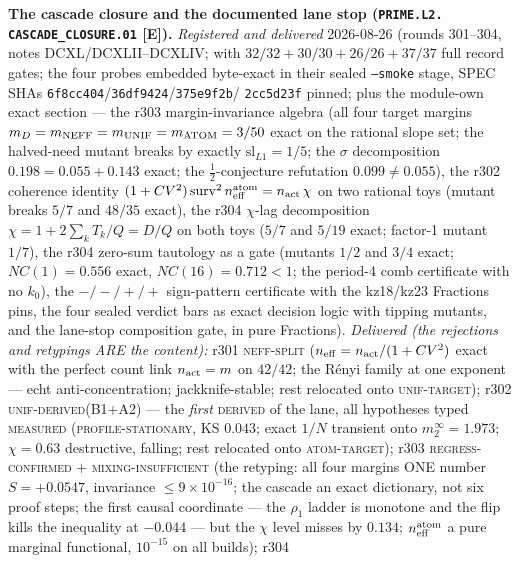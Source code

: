 \documentclass[11pt,a4paper]{article}
\begin{document}
\par\smallskip\noindent\textbf{The cascade closure and the
documented lane stop (\texttt{PRIME.L2.\allowbreak
CASCADE\_CLOSURE.01} [E]).}
{\sloppy
\emph{Registered and delivered} 2026-08-26 (rounds 301--304, notes
DCXL/DCXLII--DCXLIV;  with
$32/32 + 30/30 + 26/26 + 37/37$ full record gates; the four probes
embedded byte-exact in their sealed \texttt{--smoke} stage, SPEC
SHAs \texttt{6f8cc404}/\texttt{36df9424}/\texttt{375e9f2b}/%
\texttt{2cc5d23f} pinned; plus the module-own exact section --- the
r303 margin-invariance algebra (all four target margins $m_D =
m_{\rm NEFF} = m_{\rm UNIF} = m_{\rm ATOM} = 3/50$ exact on the
rational slope set; the halved-need mutant breaks by exactly
$\mathrm{sl}_{L1} = 1/5$; the $\sigma$ decomposition $0.198 = 0.055
+ 0.143$ exact; the $\tfrac12$-conjecture refutation $0.099 \ne
0.055$), the r302 coherence identity $(1 + CV^2)\,\mathrm{surv}^2\,
n_{\rm eff}^{\rm atom} = n_{\rm act}\,\chi$ on two rational toys
(mutant breaks $5/7$ and $48/35$ exact), the r304 $\chi$-lag
decomposition $\chi = 1 + 2\sum_k T_k/Q = D/Q$ on both toys ($5/7$
and $5/19$ exact; factor-1 mutant $1/7$), the r304 zero-sum
tautology as a gate (mutants $1/2$ and $3/4$ exact; $NC(1) = 0.556$
exact, $NC(16) = 0.712 < 1$; the period-4 comb certificate with no
$k_0$), the $-/-/+/+$ sign-pattern certificate with the kz18/kz23
Fractions pins, the four sealed verdict bars as exact decision
logic with tipping mutants, and the lane-stop composition gate, in
pure Fractions).  \emph{Delivered (the rejections and retypings ARE
the content):} r301 \textsc{neff-split} ($n_{\rm eff} = n_{\rm
act}/(1 + CV^2)$ exact with the perfect count link $n_{\rm act} =
m$ on $42/42$; the R\'enyi family at one exponent --- echt
anti-concentration; jackknife-stable; rest relocated onto
\textsc{unif-target}); r302 \textsc{unif-derived}(B1{+}A2) --- the
\emph{first} \textsc{derived} of the lane, all hypotheses typed
\textsc{measured} (\textsc{profile-stationary}, KS $0.043$; exact
$1/N$ transient onto $m_2^\infty = 1.973$; $\chi = 0.63$
destructive, falling; rest relocated onto \textsc{atom-target});
r303 \textsc{regress-confirmed} $+$ \textsc{mixing-insufficient}
(the retyping: all four margins ONE number $S = +0.0547$,
invariance $\le 9\times10^{-16}$; the cascade an exact dictionary,
not six proof steps; the first causal coordinate --- the $\rho_1$
ladder is monotone and the flip kills the inequality at $-0.044$
--- but the $\chi$ level misses by $0.134$; $n_{\rm eff}^{\rm
atom}$ a pure marginal functional, $10^{-15}$ on all builds); r304
}
\end{document}
